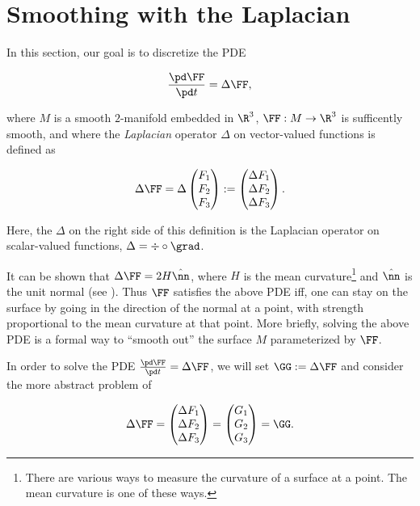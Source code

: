 \newpage

\section{Smoothing with the Laplacian}

In this section, our goal is to discretize the PDE

\begin{align*}
    \frac{\pd \FF}{\pd t} = \Delta \FF,
\end{align*}

where $M$ is a smooth $2$-manifold embedded in $\R^3$, $\FF:M \rightarrow \R^3$ is sufficently smooth, and where the \textit{Laplacian} operator $\Delta$ on vector-valued functions is defined as

\begin{align*}
    \Delta \FF = \Delta \begin{pmatrix} F_1 \\ F_2 \\ F_3 \end{pmatrix} := \begin{pmatrix} \Delta F_1 \\ \Delta F_2 \\ \Delta F_3 \end{pmatrix}.
\end{align*}

Here, the $\Delta$ on the right side of this definition is the Laplacian operator on scalar-valued functions, $\Delta = \div \circ \grad$.

It can be shown that $\Delta \FF = 2H\hat{\nn}$, where $H$ is the mean curvature\footnote{There are various ways to measure the curvature of a surface at a point. The mean curvature is one of these ways.} and $\hat{\nn}$ is the unit normal (see \cite[p. 114]{book::DDG}). Thus $\FF$ satisfies the above PDE iff, one can stay on the surface by going in the direction of the normal at a point, with strength proportional to the mean curvature at that point. More briefly, solving the above PDE is a formal way to ``smooth out'' the surface $M$ parameterized by $\FF$.

In order to solve the PDE $\frac{\pd \FF}{\pd t} = \Delta \FF$, we will set $\GG := \Delta \FF$ and consider the more abstract problem of

\begin{align*}
    \Delta \FF
    =
    \begin{pmatrix} \Delta F_1 \\ \Delta F_2 \\ \Delta F_3 \end{pmatrix}
    =
    \begin{pmatrix} G_1 \\ G_2 \\ G_3 \end{pmatrix}
    =
    \GG.
\end{align*}

